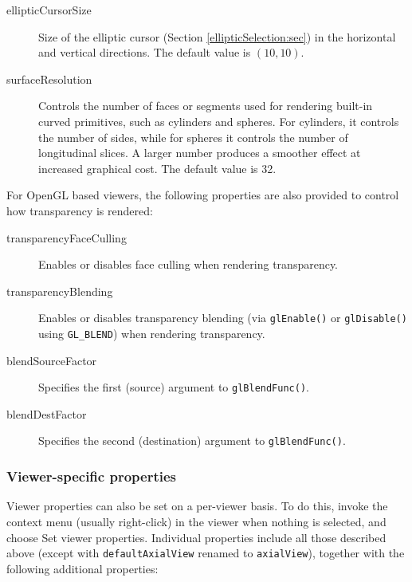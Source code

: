 \documentclass{article}
\begin{document}
\begin{description}
\item[ellipticCursorSize]\mbox{}

Size of the elliptic cursor (Section \ref{ellipticSelection:sec}) in
the horizontal and vertical directions. The default value is
$(10, 10)$.

\item[surfaceResolution]\mbox{}

Controls the number of faces or segments used for
rendering built-in curved primitives, such as cylinders and
spheres. For cylinders, it controls the number of sides, while for
spheres it controls the number of longitudinal slices. A larger number
produces a smoother effect at increased graphical cost. The default
value is 32.

\end{description}

For OpenGL based viewers, the following properties are also provided
to control how transparency is rendered:

\begin{description}

\item[transparencyFaceCulling]\mbox{}

Enables or disables face culling when rendering transparency.

\item[transparencyBlending]\mbox{}

Enables or disables transparency blending (via {\tt glEnable()} or
{\tt glDisable()} using {\tt GL\_BLEND}) when rendering transparency.

\item[blendSourceFactor]\mbox{}

Specifies the first (source) argument to {\tt glBlendFunc()}.

\item[blendDestFactor]\mbox{}

Specifies the second (destination) argument to {\tt glBlendFunc()}.

\end{description}

\subsubsection{Viewer-specific properties}
\label{ViewerSpecificProps:sec}

Viewer properties can also be set on a per-viewer basis. To do this,
invoke the context menu (usually right-click) in the viewer when
nothing is selected, and choose {\sf Set viewer properties}.
Individual properties include all those described above (except with
{\tt defaultAxialView} renamed to {\tt axialView}), together with the
following additional properties:
\end{document}

